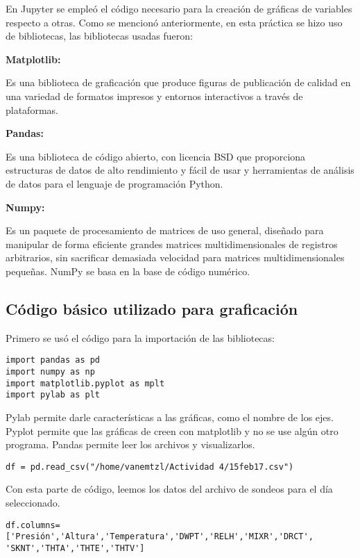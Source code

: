 \documentclass[12pt]{article}
\begin{document}
\begin{doublespace}
En Jupyter se empleó el código necesario para la creación de gráficas de variables respecto a otras. Como se mencionó anteriormente, en esta práctica se hizo uso de bibliotecas, las bibliotecas usadas fueron:
\begin{enumerate}
{\item \bfseries Matplotlib:} Es una biblioteca de graficación que produce figuras de publicación de calidad en una variedad de formatos impresos y entornos interactivos a través de plataformas.
{\item \bfseries Pandas:} Es una biblioteca de código abierto, con licencia BSD que proporciona estructuras de datos de alto rendimiento y fácil de usar y herramientas de análisis de datos para el lenguaje de programación Python.
{\item \bfseries Numpy:} Es un paquete de procesamiento de matrices de uso general, diseñado para manipular de forma eficiente grandes matrices multidimensionales de registros arbitrarios, sin sacrificar demasiada velocidad para matrices multidimensionales pequeñas. NumPy se basa en la base de código numérico.
\end{enumerate}

\subsection*{Código básico utilizado para graficación}
Primero se usó el código para la importación de las bibliotecas:
\begin{verbatim}
import pandas as pd
import numpy as np
import matplotlib.pyplot as mplt
import pylab as plt
\end{verbatim}

Pylab permite darle características a las gráficas, como el nombre de los ejes. Pyplot permite que las gráficas de creen con matplotlib y no se use algún otro programa. Pandas permite leer los archivos y visualizarlos.

\begin{verbatim}
df = pd.read_csv("/home/vanemtzl/Actividad 4/15feb17.csv")
\end{verbatim}

Con esta parte de código, leemos los datos del archivo de sondeos para el día seleccionado.

\begin{verbatim}
df.columns= ['Presión','Altura','Temperatura','DWPT','RELH','MIXR','DRCT',
'SKNT','THTA','THTE','THTV']
\end{verbatim}


\end{doublespace}
\end{document}

